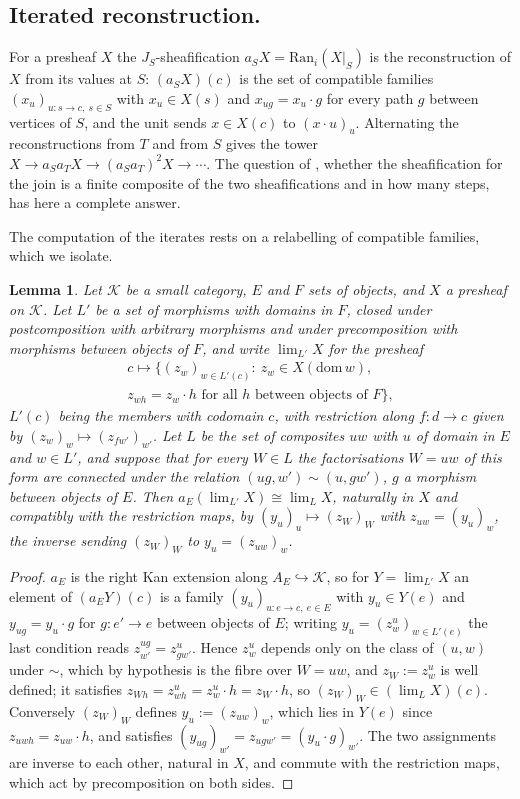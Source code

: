 \documentclass[11pt]{amsart}
\newtheorem{lem}[thm]{Lemma}
\theoremstyle{definition}
\newcommand{\Ran}{\mathrm{Ran}}
\begin{document}
\subsection*{Iterated reconstruction.}
For a presheaf $X$ the $J_S$-sheafification $a_SX=\Ran_i(X|_S)$ is the
reconstruction of $X$ from its values at $S$: $(a_SX)(c)$ is the set of
compatible families $(x_u)_{u\colon s\to c,\ s\in S}$ with $x_u\in X(s)$
and $x_{ug}=x_u\cdot g$ for every path $g$ between vertices of $S$, and
the unit sends $x\in X(c)$ to $(x\cdot u)_u$. Alternating the
reconstructions from $T$ and from $S$ gives the tower $X\to a_Sa_TX\to
(a_Sa_T)^2X\to\cdots$. The question of \cite{Fijoin}, whether the
sheafification for the join is a finite composite of the two
sheafifications and in how many steps, has here a complete answer.

The computation of the iterates rests on a relabelling of compatible
families, which we isolate.

\begin{lem}\label{lem:relabel}
Let $\mathcal K$ be a small category, $E$ and $F$ sets of objects, and
$X$ a presheaf on $\mathcal K$. Let $L'$ be a set of morphisms with
domains in $F$, closed under postcomposition with arbitrary morphisms
and under precomposition with morphisms between objects of $F$, and
write $\lim_{L'}X$ for the presheaf
\begin{multline*}
c\mapsto\{(z_w)_{w\in L'(c)}:\ z_w\in X(\mathrm{dom}\,w),\\
z_{wh}=z_w\cdot h\text{ for all }h\text{ between objects of }F\},
\end{multline*}
$L'(c)$ being the members with codomain $c$, with restriction along
$f\colon d\to c$ given by $(z_w)_w\mapsto(z_{fw'})_{w'}$. Let $L$ be the
set of composites $uw$ with $u$ of domain in $E$ and $w\in L'$, and
suppose that for every $W\in L$ the factorisations $W=uw$ of this form
are connected under the relation $(ug,w')\sim(u,gw')$, $g$ a morphism
between objects of $E$. Then $a_E(\lim_{L'}X)\cong\lim_LX$, naturally in
$X$ and compatibly with the restriction maps, by $(y_u)_u\mapsto(z_W)_W$
with $z_{uw}=(y_u)_w$, the inverse sending $(z_W)_W$ to
$y_u=(z_{uw})_{w}$.
\end{lem}
\begin{proof}
$a_E$ is the right Kan extension along $A_E\hookrightarrow\mathcal K$,
so for $Y=\lim_{L'}X$ an element of $(a_EY)(c)$ is a family
$(y_u)_{u\colon e\to c,\ e\in E}$ with $y_u\in Y(e)$ and $y_{ug}=y_u\cdot
g$ for $g\colon e'\to e$ between objects of $E$; writing
$y_u=(z^u_w)_{w\in L'(e)}$ the last condition reads
$z^{ug}_{w'}=z^u_{gw'}$. Hence $z^u_w$ depends only on the class of
$(u,w)$ under $\sim$, which by hypothesis is the fibre over $W=uw$, and
$z_W:=z^u_w$ is well defined; it satisfies $z_{Wh}=z^u_{wh}=z^u_w\cdot
h=z_W\cdot h$, so $(z_W)_W\in(\lim_LX)(c)$. Conversely $(z_W)_W$ defines
$y_u:=(z_{uw})_w$, which lies in $Y(e)$ since $z_{uwh}=z_{uw}\cdot h$,
and satisfies $(y_{ug})_{w'}=z_{ugw'}=(y_u\cdot g)_{w'}$. The two
assignments are inverse to each other, natural in $X$, and commute with
the restriction maps, which act by precomposition on both sides.
\end{proof}
\end{document}
